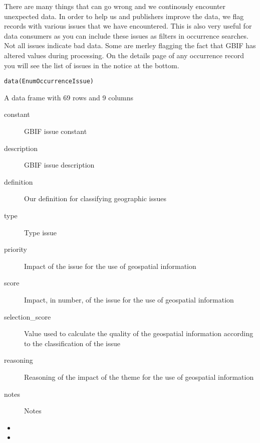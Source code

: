 \documentclass[a4paper]{book}
\begin{document}
%
\begin{Description}
There are many things that can go wrong and we continously encounter unexpected data.
In order to help us and publishers improve the data, we flag records with various issues
that we have encountered. This is also very useful for data consumers as you can include
these issues as filters in occurrence searches. Not all issues indicate bad data.
Some are merley flagging the fact that GBIF has altered values during processing.
On the details page of any occurrence record you will see the list of issues in the notice at the bottom.
\end{Description}
%
\begin{Usage}
\begin{verbatim}
data(EnumOccurrenceIssue)
\end{verbatim}
\end{Usage}
%
\begin{Format}
A data frame with 69 rows and 9 columns
\end{Format}
%
\begin{Details}
\begin{description}

\item[constant] GBIF issue constant
\item[description] GBIF issue description
\item[definition] Our definition for classifying geographic issues
\item[type] Type issue
\item[priority] Impact of the issue for the use of geospatial information
\item[score] Impact, in number, of the issue for the use of geospatial information
\item[selection\_score] Value used to calculate the quality of the geospatial information according to the classification of the issue
\item[reasoning] Reasoning of the impact of the theme for the use of geospatial information
\item[notes] Notes

\end{description}

\end{Details}
%
\begin{Source}
\begin{itemize}

\item{} 
\item{} 

\end{itemize}

\end{Source}
\end{document}
